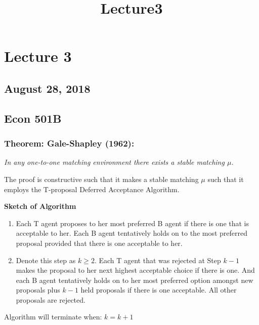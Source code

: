 \documentclass[11pt]{article}
\title{Lecture3}
\providecommand{\tightlist}{%
      \setlength{\itemsep}{0pt}\setlength{\parskip}{0pt}}
\begin{document}
    
    
    \maketitle
    
    

    
    \section{Lecture 3}\label{lecture-3}

\subsection{August 28, 2018}\label{august-28-2018}

\subsection{Econ 501B}\label{econ-501b}

    \subsubsection{Theorem: Gale-Shapley
(1962):}\label{theorem-gale-shapley-1962}

\emph{In any one-to-one matching environment there exists a stable
matching \(\mu\).}

The proof is constructive such that it makes a stable matching \(\mu\)
such that it employs the T-proposal Deferred Acceptance Algorithm.

\textbf{Sketch of Algorithm}

\begin{enumerate}
\def\labelenumi{\arabic{enumi}.}
\tightlist
\item
  Each T agent proposes to her most preferred B agent if there is one
  that is acceptable to her. Each B agent tentatively holds on to the
  most preferred proposal provided that there is one acceptable to her.
\item
  Denote this step as \(k \ge 2\). Each T agent that was rejected at
  Step \(k-1\) makes the proposal to her next highest acceptable choice
  if there is one. And each B agent tentatively holds on to her most
  preferred option amongst new proposals plus \(k-1\) held proposals if
  there is one acceptable. All other proposals are rejected.
\end{enumerate}

Algorithm will terminate when: \(k = k+1\)
\end{document}
